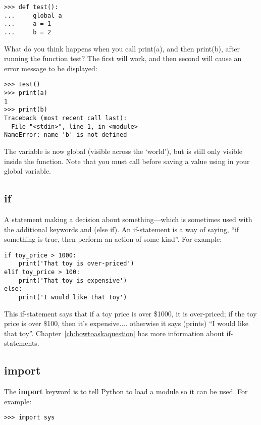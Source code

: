 \begin{Verbatim}[frame=single]
>>> def test():
...     global a
...     a = 1
...     b = 2
\end{Verbatim}

What do you think happens when you call print(a), and then print(b), after running the function test?  The first will work, and then second will cause an error message to be displayed:

\begin{Verbatim}[frame=single]
>>> test()
>>> print(a)
1
>>> print(b)
Traceback (most recent call last):
  File "<stdin>", line 1, in <module>
NameError: name 'b' is not defined
\end{Verbatim}

The variable  is now global (visible across the `world'), but  is still only visible inside the function.  Note that you must call  before saving a value using in your global variable.

\subsection*{if}

A statement making a decision about something---which is sometimes used with the additional keywords  and  (else if).  An if-statement is a way of saying, ``if something is true, then perform an action of some kind''.  For example:

\begin{Verbatim}[frame=single]
if toy_price > 1000:
    print('That toy is over-priced')
elif toy_price > 100:
    print('That toy is expensive')
else:
    print('I would like that toy')
\end{Verbatim}

This if-statement says that if a toy price is over \$1000, it is over-priced; if the toy price is over \$100, then it's expensive.... otherwise it says (prints) ``I would like that toy''. Chapter~\ref{ch:howtoaskaquestion} has more information about if-statements.

\subsection*{import}

The \textbf{import} keyword is to tell Python to load a module so it can be used. For example:

\begin{Verbatim}[frame=single]
>>> import sys
\end{Verbatim}

